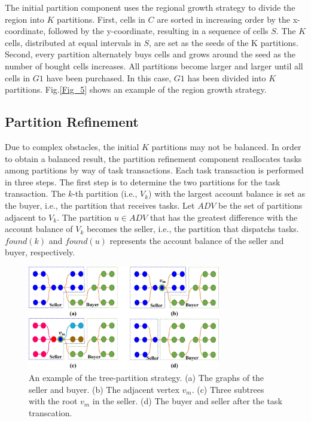\documentclass[journal,article,submit,pdftex,moreauthors]{Definitions/mdpi}
\begin{document}
The initial partition component uses the regional growth strategy to divide the region into $K$ partitions. First, cells in $C$ are sorted in increasing order by the x-coordinate, followed by the y-coordinate, resulting in a sequence of cells $S$. The $K$ cells, distributed at equal intervals in $S$, are set as the seeds of the K partitions. Second, every partition alternately buys cells and grows around the seed as the number of bought cells increases. All partitions become larger and larger until all cells in $G1$ have been purchased. In this case, $G1$ has been divided into $K$ partitions. Fig.\ref{Fig_5} shows an example of the region growth strategy.

\subsection{Partition Refinement}
Due to complex obstacles, the initial $K$ partitions may not be balanced. In order to obtain a balanced result, the partition refinement component reallocates tasks among partitions by way of task transactions. Each task transaction is performed in three steps. The first step is to determine the two partitions for the task transaction. The $k$-th partition (i.e., $V_k$) with the largest account balance is set as the buyer, i.e., the partition that receives tasks. Let $ADV$ be the set of partitions adjacent to $V_k$. The partition $u \in ADV$ that has the greatest difference with the account balance of $V_k$ becomes the seller, i.e., the partition that dispatchs tasks.
$found(k)$ and $found(u)$ represents the account balance of the seller and buyer, respectively.

\begin{figure}[htbb] %
	\centering  %
    \vspace{0 cm} %
    \includegraphics[width=0.75\textwidth]{6.jpg}
    \caption{ An example of the tree-partition strategy. (a) The graphs of the seller and buyer. (b) The adjacent vertex $v_m$. (c) Three subtrees with the root $v_m$ in the seller. (d) The buyer and seller after the task transcation.}
   \label{Fig_6}
\end{figure}
\end{document}
